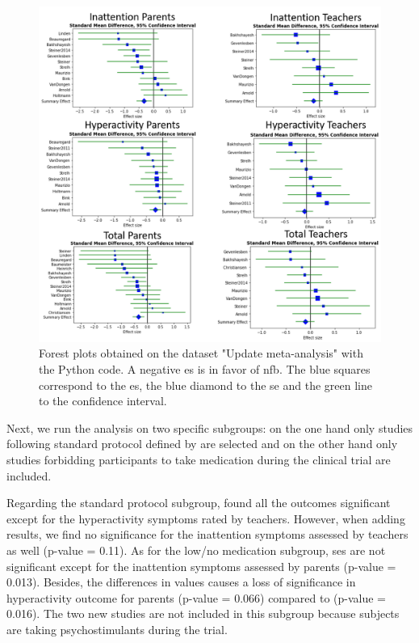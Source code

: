 \begin{figure}[h!]
  \centering
  \includegraphics[width=1.0\linewidth]{figures/meta_review_forest_plots_update_meta_analysis_our_choices_no_colors_2-columns_fitting_image}
  \caption{Forest plots obtained on the dataset "Update meta-analysis" with the Python code. A negative \gls{es} is in favor of \gls{nfb}. 
	The blue squares correspond to the \gls{es}, the blue diamond to the \gls{se} and the green line to the confidence interval.}
  \label{Figure:meta_review_forest_plots_update_meta_analysis_our_choices_no_colors_2-columns_fitting_image}
\end{figure}

Next, we run the analysis on two specific subgroups: on the one hand only studies following standard protocol defined by \citet{Arns2014}
are selected and on the other hand only studies forbidding participants to take medication during the clinical trial are included. 

Regarding the standard protocol subgroup, \citet{Cortese2016} found all the outcomes significant except for the hyperactivity symptoms 
rated by teachers. However, when adding \citep{Strehl2017} results, we find no significance for the inattention symptoms assessed by 
teachers as well (p-value = 0.11). 
As for the low/no medication subgroup, \glspl{se} are not significant except for the inattention symptoms assessed by parents (p-value = 0.013). 
Besides, the differences in \citet{Arnold2014} values causes a loss of significance in 
hyperactivity outcome for parents (p-value = 0.066) compared to \citet{Cortese2016} (p-value = 0.016). The two new studies are not 
included in this subgroup because subjects are taking psychostimulants during the trial.

